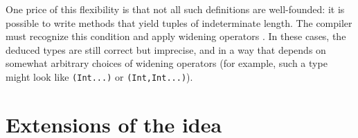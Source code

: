 \documentclass[preprint]{sigplanconf}
\newcommand{\code}[1]{\texttt{#1}}
\begin{document}
One price of this flexibility is that not all such definitions are well-founded:
it is possible to write methods that yield tuples of indeterminate length.
The compiler must recognize this condition and apply widening operators
\cite{Cousot:1977} \cite{widening}. In these cases, the deduced types are
still correct but imprecise, and in a way that depends on somewhat arbitrary
choices of widening operators (for example, such a type might look
like \code{(Int...)} or \code{(Int,Int...)}).









\section{Extensions of the idea}
\end{document}
